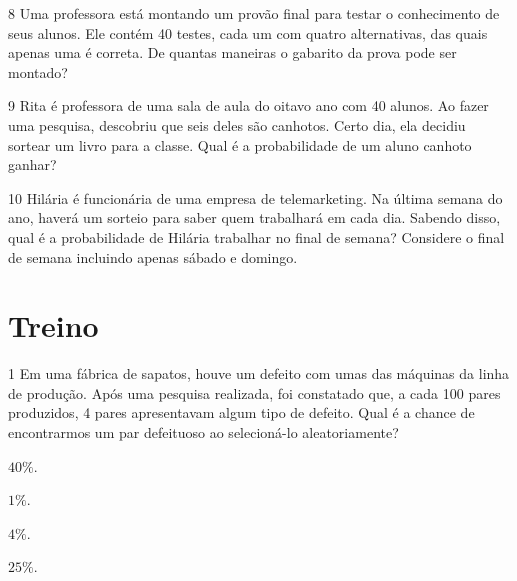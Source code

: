 \num{8} Uma professora está montando um provão final para testar o
conhecimento de seus alunos. Ele contém 40 testes, cada um com quatro
alternativas, das quais apenas uma é correta. De quantas maneiras o
gabarito da prova pode ser montado?


\num{9} Rita é professora de uma sala de aula do oitavo ano com 40 alunos. Ao
fazer uma pesquisa, descobriu que seis deles são canhotos. Certo dia, ela
decidiu sortear um livro para a classe. Qual é a probabilidade de um
aluno canhoto ganhar?


\num{10} Hilária é funcionária de uma empresa de telemarketing. Na última
semana do ano, haverá um sorteio para saber quem trabalhará em cada dia.
Sabendo disso, qual é a probabilidade de Hilária trabalhar no final de
semana? Considere o final de semana incluindo apenas sábado e domingo.


\section*{Treino}

\num{1} Em uma fábrica de sapatos, houve um defeito com umas das máquinas da
linha de produção. Após uma pesquisa realizada, foi constatado que, a
cada 100 pares produzidos, 4 pares apresentavam algum tipo de defeito.
Qual é a chance de encontrarmos um par defeituoso ao selecioná-lo
aleatoriamente?

\begin{escolha}[itemsep=0pt]
\item $40\%$.
\item $1\%$.
\item $4\%$.
\item $25\%$.
\end{escolha}



